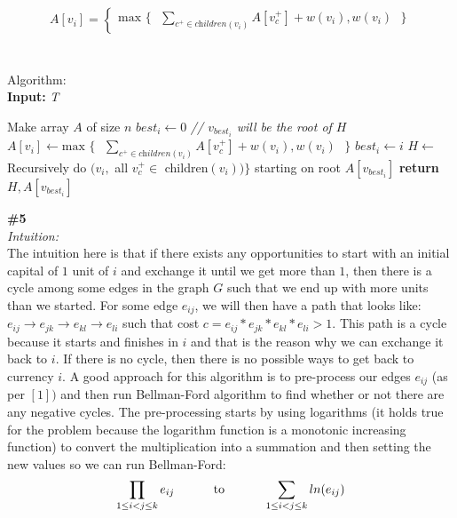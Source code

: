 \documentclass{article}
\newcommand\tab[1][1cm]{\hspace*{#1}}
\begin{document}
\\
\begin{gather*}
A[v_i] =
\begin{cases}
\text{max } \{ \text{ } \sum_{c^{+} \in \textit{children} (v_i)} A[v_c^{+}] + w(v_i) , w(v_i) \text{ } \}
\end{cases}
\end{gather*}\\
\\
Algorithm:\\
\textbf{Input:} \textit{T}
\begin{algorithmic}
\State Make array $A$ of size $n$
\State $best_i \gets 0$ \textit{// $v_{best_i}$ will be the root of $H$}
  \State $A[v_i] \gets \text{max } \{ \text{ } \sum_{c^{+} \in \textit{children} (v_i)} A[v_c^{+}] + w(v_i) , w(v_i) \text{ } \}$
    \State $best_i \gets i$
  \EndIf
\EndFor
\State $H \gets$ Recursively do $(v_i, $ all $v_c^{+} \in $ children$(v_i))\}$ starting on root $A[v_{best_i}]$
\State \textbf{return} $H, A[v_{best_i}]$\\
\end{algorithmic}
\textbf{\#5}
\\
\textit{Intuition:}
\\
The intuition here is that if there exists any opportunities to start with an initial capital of $1$ unit of $i$ and exchange it until we get more than $1$, then there is a cycle among some edges in the graph $G$ such that we end up with more units than we started. For some edge $e_{ij}$, we will then have a path that looks like: $e_{ij} \rightarrow e_{jk} \rightarrow e_{kl} \rightarrow e_{li}$ such that cost $c = e_{ij} * e_{jk} * e_{kl} * e_{li} > 1$.  This path is a cycle because it starts and finishes in $i$ and that is the reason why we can exchange it back to $i$. If there is no cycle, then there is no possible ways to get back to currency $i$. A good approach for this algorithm is to pre-process our edges $e_{ij}$ (as per $[1])$ and then run Bellman-Ford algorithm to find whether or not there are any negative cycles. The pre-processing starts by using logarithms (it holds true for the problem because the logarithm function is a monotonic increasing function) to convert the multiplication into a summation and then setting the new values so we can run Bellman-Ford: 
\begin{equation}
\prod_{1 \leq i < j \leq k} e_{ij}  \tab\text{ to }\tab \sum_{1 \leq i < j \leq k} ln(e_{ij}) 
\end{equation}
\end{document}
